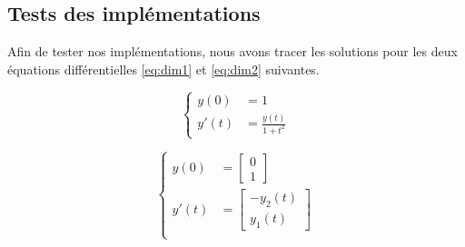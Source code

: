 \subsection{Tests des implémentations}
Afin de tester nos implémentations, nous avons tracer les solutions pour les deux équations différentielles \ref{eq:dim1} et \ref{eq:dim2} suivantes.

\begin{equation}
    \left\{
    \begin{array}{ll}
        y(0) &= 1 \\
        y'(t) &= \frac{y(t)}{1 + t^2}
    \end{array}
\right.
\label{eq:dim1}
\end{equation}

\begin{equation}
    \left\{
    \begin{array}{ll}
        y(0) &= \begin{bmatrix}
                    0 \\
                    1
                \end{bmatrix} \\
        y'(t) &= \begin{bmatrix}
                    -y_2(t) \\
                    y_1(t)
                \end{bmatrix} \\
    \end{array}
\right.
\label{eq:dim2}
\end{equation}

